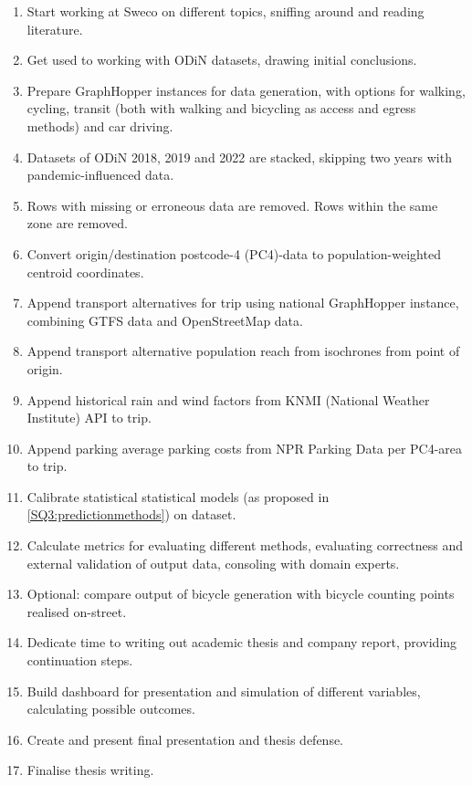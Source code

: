 \documentclass[sigconf, natbib=false, nonacm]{acmart}
\begin{document}
    \begin{enumerate}
        \item Start working at Sweco on different topics, sniffing around and reading literature.
        \item Get used to working with ODiN datasets, drawing initial conclusions.
        \item Prepare GraphHopper instances for data generation, with options for walking, cycling, transit (both with walking and bicycling as access and egress methods) and car driving. 
        \item Datasets of ODiN 2018, 2019 and 2022 are stacked, skipping two years with pandemic-influenced data. 
        \item Rows with missing or erroneous data are removed. Rows within the same zone are removed.
        \item Convert origin/destination postcode-4 (PC4)-data to population-weighted centroid coordinates.
        \item Append transport alternatives for trip using national GraphHopper instance, combining GTFS data and OpenStreetMap data.
        \item Append transport alternative population reach from isochrones from point of origin.
        \item Append historical rain and wind factors from KNMI (National Weather Institute) API to trip.
        \item Append parking average parking costs from NPR Parking Data per PC4-area to trip.
        \item Calibrate statistical statistical models (as proposed in \ref{SQ3:predictionmethods}) on dataset.
        \item Calculate metrics for evaluating different methods, evaluating correctness and external validation of output data, consoling with domain experts. 
        \item Optional: compare output of bicycle generation with bicycle counting points realised on-street. 
        \item Dedicate time to writing out academic thesis and company report, providing continuation steps. 
        \item Build dashboard for presentation and simulation of different variables, calculating possible outcomes.
        \item Create and present final presentation and thesis defense. 
        \item Finalise thesis writing.
    \end{enumerate}
\end{document}
